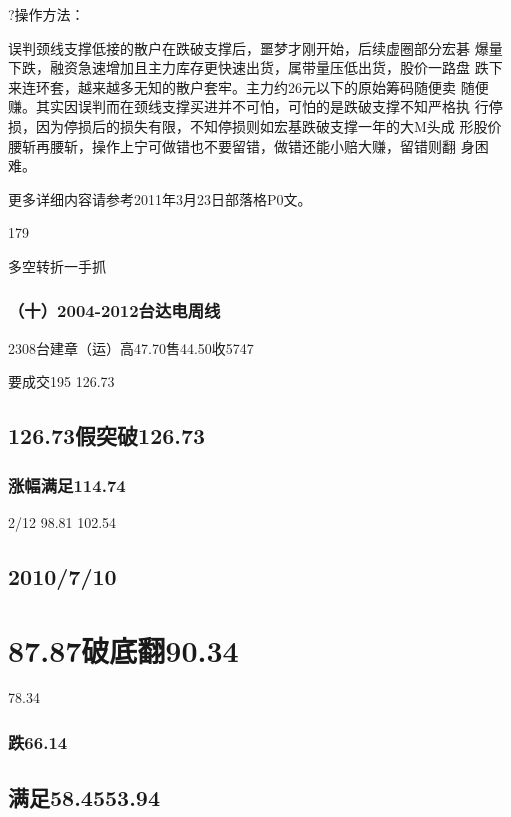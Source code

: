 \documentclass{article}
\begin{document}
?操作方法：

误判颈线支撑低接的散户在跌破支撑后，噩梦才刚开始，后续虚圈部分宏碁 爆量下跌，融资急速增加且主力库存更快速出货，属带量压低出货，股价一路盘 跌下来连环套，越来越多无知的散户套牢。主力约26元以下的原始筹码随便卖 随便赚。其实因误判而在颈线支撑买进并不可怕，可怕的是跌破支撑不知严格执 行停损，因为停损后的损失有限，不知停损则如宏基跌破支撑一年的大M头成 形股价腰斩再腰斩，操作上宁可做错也不要留错，做错还能小赔大赚，留错则翻 身困难。

更多详细内容请参考2011年3月23日部落格P0文。

179

\clearpage

多空转折一手抓

\subsubsection{（十）2004-2012台达电周线}

2308台建章（运）高47.70售44.50收5747

要成交195 126.73

\subsection{126.73假突破126.73}

\subsubsection{涨幅满足114.74}

2/12 98.81 102.54

\subsection{2010/7/10}

\section{87.87破底翻90.34}

78.34

\subsubsection{跌66.14}

\subsection{满足58.4553.94}
\end{document}
